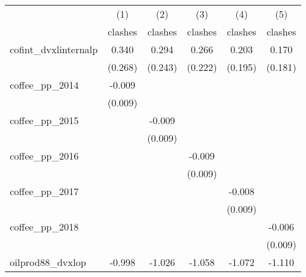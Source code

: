 {
\def\sym#1{\ifmmode^{#1}\else\(^{#1}\)\fi}
\begin{tabular}{l*{5}{c}}
\hline\hline
            &\multicolumn{1}{c}{(1)}&\multicolumn{1}{c}{(2)}&\multicolumn{1}{c}{(3)}&\multicolumn{1}{c}{(4)}&\multicolumn{1}{c}{(5)}\\
            &\multicolumn{1}{c}{clashes}&\multicolumn{1}{c}{clashes}&\multicolumn{1}{c}{clashes}&\multicolumn{1}{c}{clashes}&\multicolumn{1}{c}{clashes}\\
\hline
cofint\_dvxlinternalp&       0.340         &       0.294         &       0.266         &       0.203         &       0.170         \\
            &     (0.268)         &     (0.243)         &     (0.222)         &     (0.195)         &     (0.181)         \\
[1em]
coffee\_pp\_2014&      -0.009         &                     &                     &                     &                     \\
            &     (0.009)         &                     &                     &                     &                     \\
[1em]
coffee\_pp\_2015&                     &      -0.009         &                     &                     &                     \\
            &                     &     (0.009)         &                     &                     &                     \\
[1em]
coffee\_pp\_2016&                     &                     &      -0.009         &                     &                     \\
            &                     &                     &     (0.009)         &                     &                     \\
[1em]
coffee\_pp\_2017&                     &                     &                     &      -0.008         &                     \\
            &                     &                     &                     &     (0.009)         &                     \\
[1em]
coffee\_pp\_2018&                     &                     &                     &                     &      -0.006         \\
            &                     &                     &                     &                     &     (0.009)         \\
[1em]
oilprod88\_dvxlop&      -0.998         &      -1.026         &      -1.058         &      -1.072         &      -1.110         \\

\end{tabular}}
